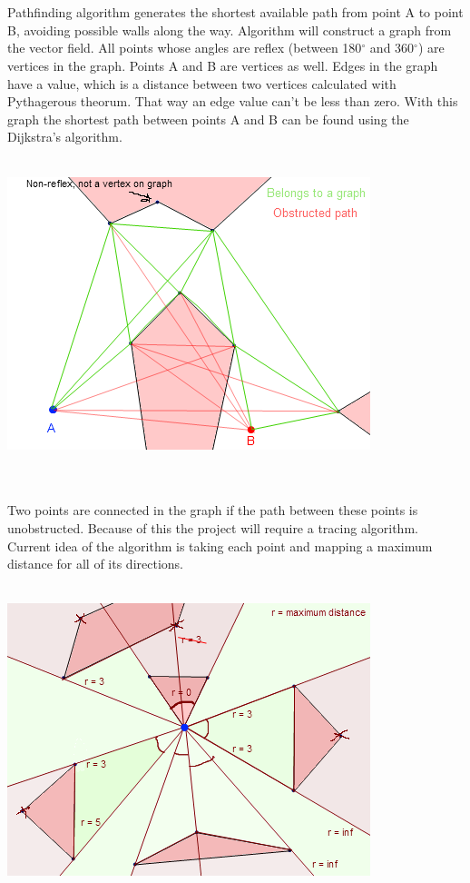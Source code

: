 \documentclass[a4paper,12pt]{article}
\begin{document}
\\
\\
Pathfinding algorithm generates the shortest available path from point A to point B,
avoiding possible walls along the way. Algorithm will construct a graph from the vector field.
All points whose angles are reflex (between 180$^\circ$ and 360$^\circ$) are vertices in the graph. Points A and B are vertices as well. Edges in the graph have a value, which is a distance between two vertices calculated with Pythagerous theorum. That way an edge value can't be less than zero. With this graph the shortest path between points A and B can be found using the Dijkstra's algorithm.
\\
\\
\centerline{\includegraphics[scale=0.5]{graph.png}} \hspace*{\fill}
\\
\\
Two points are connected in the graph if the path between these points is unobstructed.
Because of this the project will require a tracing algorithm. Current idea of the algorithm is taking each point and mapping a maximum distance for all of its directions.
\\
\\
\centerline{\includegraphics[scale=0.5]{trace.png}} \hspace*{\fill}
\end{document}
